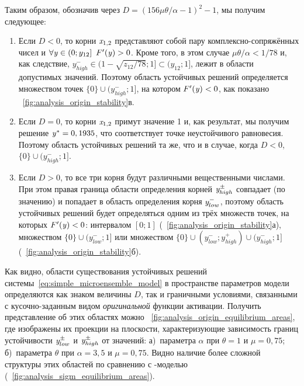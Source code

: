 Таким образом, обозначив через $D = \left( 156 \mu \theta / \alpha - 1\right)^{2} - 1$, мы получим следующее:
\begin{enumerate}[wide]
    \item Если $D < 0$, то корни $\mathit{x}_{1,2}$ представляют собой пару комплексно-сопряжённых чисел и $\forall\scalar{y} \in \left(0; y_{12}\right]\ F^{\prime}(\scalar{y}) > 0$. Кроме того, в этом случае $\mu \theta / \alpha < 1 / 78$ и, как следствие, $y_{high}^{-} \in (1 - \sqrt{z_{12} / 78}; 1] \subset (y_{12}; 1]$, \ie лежит в области допустимых значений. Поэтому область устойчивых решений определяется множеством точек $\{0\} \cup (y_{high}^{-}; 1]$, на котором $F^{\prime}(\mathit{y}) < 0$, как показано \onfigure~\ref{fig:analysis_origin_stability}в.
    \item Если $D = 0$, то корни $\mathit{x}_{1,2}$ примут значение 1 и, как результат, мы получим решение $\mathit{y}^{*} = 0,1935$, что соответствует точке неустойчивого равновесия. Поэтому область устойчивых решений та же, что и в случае, когда $D < 0$, \ie $\{0\} \cup (y_{high}^{-}; 1]$.
    \item Если $D > 0$, то все три корня будут различными вещественными числами. При этом правая граница области определения корней $\mathit{y}^{\pm}_{high}$ совпадает (по значению) и попадает в область определения корня $\mathit{y}^{-}_{low}$, поэтому область устойчивых решений будет определяться одним из трёх множеств точек, на которых $F^{\prime}(\mathit{y}) < 0$: интервалом $[0; 1]$ (\seefigure~\ref{fig:analysis_origin_stability}а), множеством $\{0\} \cup (y_{low}^{-}; 1]$ или множеством $\{0\} \cup (y_{low}^{-}; y_{high}^{+}) \cup (y_{high}^{-}; 1]$ (\seefigure~\ref{fig:analysis_origin_stability}б).
\end{enumerate}

Как видно, области существования устойчивых решений системы~\eqref{eq:simple_microensemble_model} в пространстве параметров модели определяются как знаком величины $D$, так и граничными условиями, связанными с кусочно-заданным видом \textit{оригинальной} функции активации. Получить представление об этих областях можно \onfigure~\ref{fig:analysis_origin_equilibrium_areas}, где изображены их проекции на плоскости, характеризующие зависимость границ устойчивости $\mathit{y}_{low}^{\pm}$ и $\mathit{y}_{high}^{\pm}$ от значений: а)~параметра $\alpha$ при $\theta = 1$ и $\mu = 0,75$; б)~параметра $\theta$ при $\alpha = 3,5$ и $\mu = 0,75$. Видно наличие более сложной структуры этих областей по сравнению с -моделью (\seefigure~\ref{fig:analysis_sigm_equilibrium_areas}).

